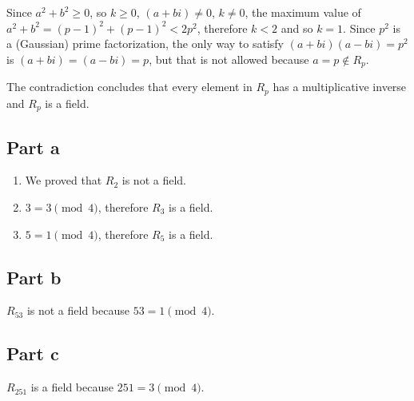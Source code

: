 Since $ a^2 + b^2 \ge 0 $, so $ k \ge 0 $,  $ (a + bi) \ne 0 $, $ k \ne 0 $, the maximum value of $ a^2 + b^2 = (p-1)^2 + (p-1)^2 < 2p^2 $, therefore $ k < 2 $ and so $ k = 1 $. Since $ p^2 $ is a (Gaussian) prime factorization, the only way to satisfy $ (a + bi)(a - bi) = p^2 $ is $ (a + bi) = (a - bi) = p $, but that is not allowed because $ a = p \notin R_p $. 

The contradiction concludes that every element in $ R_p $ has a multiplicative inverse and $ R_p $ is a field.

\subsection*{Part a}
\begin{enumerate}
    \item We proved that $ R_2 $ is not a field.
    \item $ 3 = 3 \pmod{4} $, therefore $ R_3 $ is a field.
    \item $ 5 = 1 \pmod{4} $, therefore $ R_5 $ is a field.
\end{enumerate}

\subsection*{Part b}
$ R_{53} $ is not a field because $ 53 = 1 \pmod{4} $.

\subsection*{Part c}
$ R_{251} $ is  a field because $ 251 = 3 \pmod{4} $.